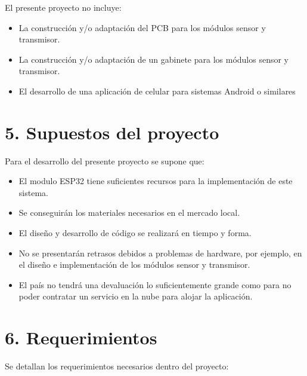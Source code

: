 \documentclass[
11pt, %
]{charter}
\begin{document}
El presente proyecto no incluye:

\begin{itemize}
\item{La construcción y/o adaptación del PCB para los módulos sensor y transmisor.}
\item{La construcción y/o adaptación de un gabinete para los módulos sensor y transmisor.}
\item{El desarrollo de una aplicación de celular para sistemas Android o similares}
\end{itemize}




\section{5. Supuestos del proyecto}
\label{sec:supuestos}


Para el desarrollo del presente proyecto se supone que:

\begin{itemize}
\item{El modulo ESP32 tiene suficientes recursos para la implementación de este sistema.}
\item{Se conseguirán los materiales necesarios en el mercado local.}
\item{El diseño y desarrollo de código se realizará en tiempo y forma.}
\item{No se presentarán retrasos debidos a problemas de hardware, por ejemplo, en el diseño e implementación de los módulos sensor y transmisor.}
\item{El país no tendrá una devaluación lo suficientemente grande como para no poder contratar un servicio en la nube para alojar la aplicación.}
\end{itemize}







\section{6. Requerimientos}
\label{sec:requerimientos}

Se detallan los requerimientos necesarios dentro del proyecto:
\end{document}
